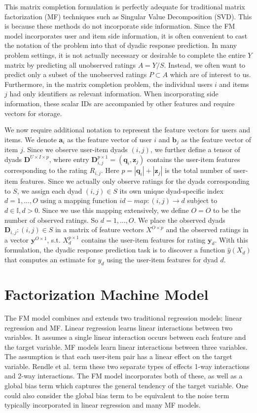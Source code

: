 \documentclass[10pt]{journal}
\begin{document}
This matrix completion formulation is perfectly adequate for traditional matrix
factorization (MF) techniques such as Singular Value Decomposition (SVD). This is
because these methods do not incorporate side information. Since the FM model
incorporates user and item side information, it is often convenient to cast the
notation of the problem into that of dyadic response prediction. In many problem
settings, it is not actually necessary or desirable to complete the entire $Y$
matrix by predicting all unobserved ratings $A = Y / S$. Instead, we often want
to predict only a subset of the unobserved ratings $P \subset A$ which are of
interest to us. Furthermore, in the matrix completion problem, the individual
users $i$ and items $j$ had only identifiers as relevant information. When
incorporating side information, these scalar IDs are accompanied by other
features and require vectors for storage.

We now require additional notation to represent the feature vectors for users
and items. We denote $\bm{a}_i$ as the feature vector of user $i$ and $\bm{b}_j$
as the feature vector of item $j$. Since we observe user-item dyads $(i, j)$, we
further define a tensor of dyads $\bm{D}^{U \times I \times p}$, where entry
$\bm{D}_{i, j}^{p \times 1} = (\bm{q}_i, \bm{z}_j)$ contains the user-item
features corresponding to the rating $R_{i, j}$. Here $p = |\bm{q}_i| +
|\bm{z}_j|$ is the total number of user-item features. Since we actually only
observe ratings for the dyads corresponding to $S$, we assign each dyad $(i, j)
\in S$ its own unique dyad-specific index $d = {1, ..., O}$ using a mapping
function $id-map: (i, j) \rightarrow d$ subject to $d \in \mathbb{I}, d > 0$.
Since we use this mapping extensively, we define $O = O$ to be the number of
observed ratings. So $d = {1, ..., O}$. We place the observed dyads $\bm{D}_{i,
j}: (i, j) \in S$ in a matrix of feature vectors $X^{O \times p}$ and the
observed ratings in a vector $\bm{y}^{O \times 1}$, s.t. $X_d^{p \times 1}$
contains the user-item features for rating $\bm{y}_d$. With this formulation,
the dyadic response prediction task is to discover a function $\hat{y}(X_d)$
that computes an estimate for $y_d$ using the user-item features for dyad $d$.


\section{Factorization Machine Model}

The FM model combines and extends two traditional regression models: linear
regression and MF. Linear regression learns linear interactions between two
variables. It assumes a single linear interaction occurs between each feature
and the target variable. MF models learn linear interactions between three
variables. The assumption is that each user-item pair has a linear effect on the
target variable. Rendle et al. term these two separate types of effects 1-way
interactions and 2-way interactions. The FM model incorporates both of these, as
well as a global bias term which captures the general tendency of the target
variable. One could also consider the global bias term to be equivalent to the
noise term typically incorporated in linear regression and many MF models.
\end{document}

